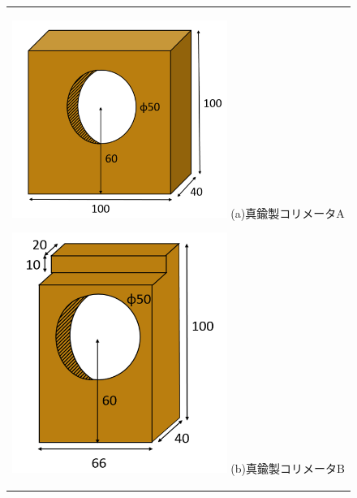 \begin{figure}[H]
	\centering
		\begin{tabular}{c}
			\begin{minipage}[t]{0.5\hsize}
				\centering
					\includegraphics[width=70mm]{fig/isb/collimator1.png}
					\hspace{1.6cm} (a)真鍮製コリメータA
			\end{minipage}
			\begin{minipage}[t]{0.5\hsize}
				\centering
					\includegraphics[width=70mm]{fig/isb/collimator2.png}
					\hspace{1.6cm} (b)真鍮製コリメータB
			\end{minipage}
		\end{tabular}
\end{figure}
